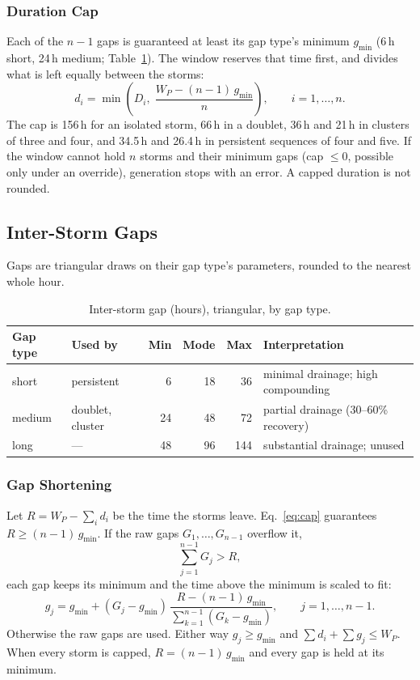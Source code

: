 \documentclass[11pt,a4paper]{article}
\begin{document}
\subsubsection{Duration Cap}
Each of the $n-1$ gaps is guaranteed at least its gap type's minimum $g_{\min}$ (6\,h short,
24\,h medium; Table~\ref{tab:gap}). The window reserves that time first, and divides what
is left equally between the storms:
\begin{equation}
    d_i = \min\!\left(D_i,\; \frac{W_P - (n-1)\,g_{\min}}{n}\right), \qquad i = 1, \dots, n.
    \label{eq:cap}
\end{equation}
The cap is 156\,h for an isolated storm, 66\,h in a doublet, 36\,h and 21\,h in clusters of
three and four, and 34.5\,h and 26.4\,h in persistent sequences of four and five. If the
window cannot hold $n$ storms and their minimum gaps (cap $\le 0$, possible only under an
override), generation stops with an error. A capped duration is not rounded.

\subsection{Inter-Storm Gaps}
Gaps are triangular draws on their gap type's parameters, rounded to the nearest whole hour.
\begin{table}[H]
\centering\small
\caption{Inter-storm gap (hours), triangular, by gap type.}\label{tab:gap}
\begin{tabular}{llrrrl}
\toprule
Gap type & Used by & Min & Mode & Max & Interpretation \\
\midrule
short & persistent & 6 & 18 & 36 & minimal drainage; high compounding \\
medium & doublet, cluster & 24 & 48 & 72 & partial drainage (30--60\% recovery) \\
long & --- & 48 & 96 & 144 & substantial drainage; unused \\
\bottomrule
\end{tabular}
\end{table}

\subsubsection{Gap Shortening}
Let $R = W_P - \sum_i d_i$ be the time the storms leave. Eq.~\eqref{eq:cap} guarantees
$R \ge (n-1)\,g_{\min}$. If the raw gaps $G_1, \dots, G_{n-1}$ overflow it,
\begin{equation}
    \sum_{j=1}^{n-1} G_j > R, \label{eq:overflow}
\end{equation}
each gap keeps its minimum and the time above the minimum is scaled to fit:
\begin{equation}
    g_j = g_{\min} + (G_j - g_{\min})\,\frac{R - (n-1)\,g_{\min}}{\sum_{k=1}^{n-1} (G_k - g_{\min})},
    \qquad j = 1, \dots, n-1. \label{eq:shorten}
\end{equation}
Otherwise the raw gaps are used. Either way $g_j \ge g_{\min}$ and
$\sum d_i + \sum g_j \le W_P$. When every storm is capped, $R = (n-1)\,g_{\min}$ and every
gap is held at its minimum.
\end{document}
